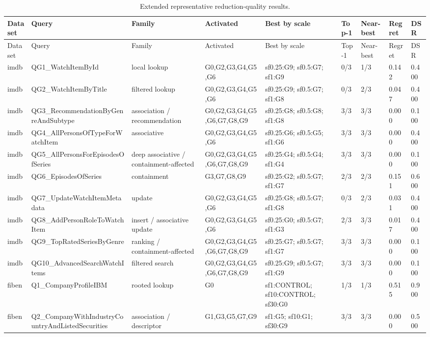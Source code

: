 \begin{longtable}{lllllllll}
\caption{Extended representative reduction-quality results.}\\
\toprule
Dataset & Query & Family & Activated & Best by scale & Top-1 & Near-best & Regret & DSR \\
\midrule
\endfirsthead
\toprule
Dataset & Query & Family & Activated & Best by scale & Top-1 & Near-best & Regret & DSR \\
\midrule
\endhead
imdb & QG1\_WatchItemById & local lookup & G0,G2,G3,G4,G5,G6 & sf0.25:G9; sf0.5:G7; sf1:G9 & 0/3 & 1/3 & 0.142 & 0.400 \\
imdb & QG2\_WatchItemByTitle & filtered lookup & G0,G2,G3,G4,G5,G6 & sf0.25:G9; sf0.5:G7; sf1:G8 & 0/3 & 2/3 & 0.047 & 0.400 \\
imdb & QG3\_RecommendationByGenreAndSubtype & association / recommendation & G0,G2,G3,G4,G5,G6,G7,G8,G9 & sf0.25:G8; sf0.5:G8; sf1:G8 & 3/3 & 3/3 & 0.000 & 0.100 \\
imdb & QG4\_AllPersonsOfTypeForWatchItem & associative & G0,G2,G3,G4,G5,G6 & sf0.25:G6; sf0.5:G5; sf1:G6 & 3/3 & 3/3 & 0.000 & 0.400 \\
imdb & QG5\_AllPersonsForEpisodesOfSeries & deep associative / containment-affected & G0,G2,G3,G4,G5,G6,G7,G8,G9 & sf0.25:G4; sf0.5:G4; sf1:G4 & 3/3 & 3/3 & 0.000 & 0.100 \\
imdb & QG6\_EpisodesOfSeries & containment & G3,G7,G8,G9 & sf0.25:G2; sf0.5:G7; sf1:G7 & 2/3 & 2/3 & 0.151 & 0.600 \\
imdb & QG7\_UpdateWatchItemMetadata & update & G0,G2,G3,G4,G5,G6 & sf0.25:G8; sf0.5:G7; sf1:G8 & 0/3 & 2/3 & 0.031 & 0.400 \\
imdb & QG8\_AddPersonRoleToWatchItem & insert / associative update & G0,G2,G3,G4,G5,G6 & sf0.25:G0; sf0.5:G7; sf1:G3 & 2/3 & 3/3 & 0.017 & 0.400 \\
imdb & QG9\_TopRatedSeriesByGenre & ranking / containment-affected & G0,G2,G3,G4,G5,G6,G7,G8,G9 & sf0.25:G7; sf0.5:G7; sf1:G7 & 3/3 & 3/3 & 0.000 & 0.100 \\
imdb & QG10\_AdvancedSearchWatchItems & filtered search & G0,G2,G3,G4,G5,G6,G7,G8,G9 & sf0.25:G9; sf0.5:G7; sf1:G9 & 3/3 & 3/3 & 0.000 & 0.100 \\
fiben & Q1\_CompanyProfileIBM & rooted lookup & G0 & sf1:CONTROL; sf10:CONTROL; sf30:G0 & 1/3 & 1/3 & 0.515 & 0.900 \\
fiben & Q2\_CompanyWithIndustryCountryAndListedSecurities & association / descriptor & G1,G3,G5,G7,G9 & sf1:G5; sf10:G1; sf30:G9 & 3/3 & 3/3 & 0.000 & 0.500 \\

\end{longtable}
